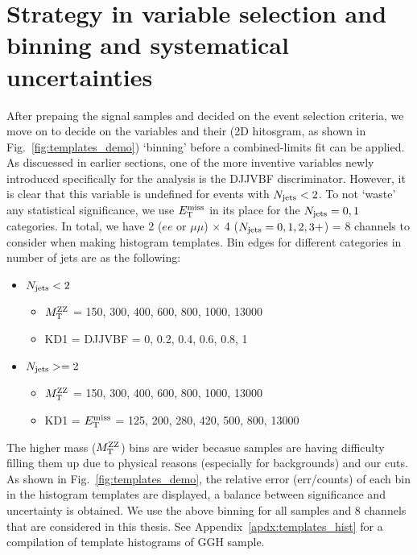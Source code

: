 \section{Strategy in variable selection and binning and systematical uncertainties}
After prepaing the signal samples and decided on the event selection criteria, we move on to
decide on the variables and their (2D hitosgram, as shown in Fig.~\ref{fig:templates_demo}) `binning' before a combined-limits
fit can be applied. As discuessed in earlier sections, one of the more inventive variables
newly introduced specifically for the analysis is the DJJVBF discriminator. However, it is
clear that this variable is undefined for events with $N_\mathrm{jets} < 2$. To
not `waste' any statistical significance, we use $E_{\mathrm{T}}^{\mathrm{miss}}$ in its place for the
$N_\mathrm{jets} = 0,1$ categories. In total, we have 2 ($ee$ or $\mu\mu$) $\times$ 4 ($N_\mathrm{jets} = 0,1,2,3+$) = 8
channels to consider when making histogram templates.
Bin edges for different categories in number of jets are as the following:
\begin{itemize} 
    \item $N_\mathrm{jets} < 2$
        \begin{itemize} 
            \item $M_\mathrm{T}^{\mathrm{ZZ}}$ = 150, 300, 400, 600, 800, 1000, 13000
            \item KD1 = DJJVBF = 0, 0.2, 0.4, 0.6, 0.8, 1
        \end{itemize}
    \item $N_\mathrm{jets} >= 2$
        \begin{itemize} 
            \item $M_\mathrm{T}^{\mathrm{ZZ}}$ = 150, 300, 400, 600, 800, 1000, 13000
            \item KD1 = $E_{\mathrm{T}}^{\mathrm{miss}}$ = 125, 200, 280, 420, 500, 800, 13000
        \end{itemize}
\end{itemize}
The higher mass ($M_\mathrm{T}^{\mathrm{ZZ}}$) bins are wider becasue samples
are having difficulty filling them up due to physical reasons (especially for backgrounds) 
and our cuts. As shown in Fig.~\ref{fig:templates_demo}, the relative error (err/counts) of each
bin in the histogram templates are displayed, a balance between significance and uncertainty is
obtained. We use the above binning for all samples and 8 channels that are considered in this
thesis. See Appendix~\ref{apdx:templates_hist} for a compilation of template histograms of GGH sample.
